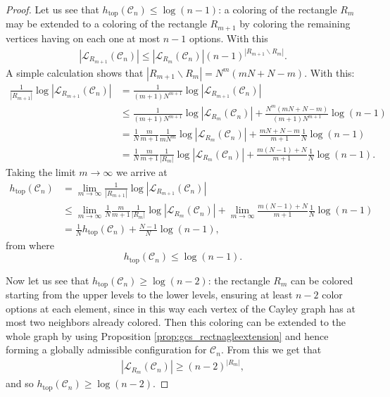 \documentclass[letterpaper,10pt]{article}
\theoremstyle{plain}
\def\htop{h_{\mathrm{top}}}
\begin{document}
\begin{proof}
	Let us see that $\htop(\mathcal{C}_n)\le \log(n-1)$: a coloring of the rectangle $R_m$ may be extended to a coloring of the rectangle $R_{m+1}$ by coloring the remaining vertices having on each one at most $n-1$ options. With this
	\begin{align*}
	|\mathcal{L}_{R_{m+1}}(\mathcal{C}_n)|\le |\mathcal{L}_{R_m}(\mathcal{C}_{n})|(n-1)^{|R_{m+1}\backslash R_m|}.
	\end{align*}
	A simple calculation shows that $|R_{m+1}\backslash R_{m}|=N^m(mN+N-m)$. 
	With this:
	\begin{align*}
	\frac{1}{|R_{m+1}|}\log|\mathcal{L}_{R_{m+1}}(\mathcal{C}_n)|&=\frac{1}{(m+1)N^{m+1}}\log|\mathcal{L}_{R_{m+1}}(\mathcal{C}_n)|\\
	&\le \frac{1}{(m+1)N^{m+1}}\log|\mathcal{L}_{R_m}(\mathcal{C}_{n})|+\frac{N^m(mN+N-m)}{(m+1)N^{m+1}}\log(n-1)\\
	&=\frac{1}{N}\frac{m}{m+1}\frac{1}{mN^{m}}\log|\mathcal{L}_{R_m}(\mathcal{C}_{n})|+ \frac{mN+N-m}{m+1}\frac{1}{N}\log(n-1)\\
	&=\frac{1}{N}\frac{m}{m+1}\frac{1}{|R_m|}\log|\mathcal{L}_{R_m}(\mathcal{C}_{n})|+ \frac{m(N-1)+N}{m+1}\frac{1}{N}\log(n-1).
	\end{align*}
	Taking the limit $m\to \infty$ we arrive at
	\begin{align*}
	\htop(\mathcal{C}_n)&=\lim_{m\to \infty }	\frac{1}{|R_{m+1}|}\log|\mathcal{L}_{R_{m+1}}(\mathcal{C}_n)|\\
	&\le \lim_{m\to \infty }\frac{1}{N}\frac{m}{m+1}\frac{1}{|R_m|}\log|\mathcal{L}_{R_m}(\mathcal{C}_{n})| +\lim_{m\to \infty }\frac{m(N-1)+N}{m+1}\frac{1}{N}\log(n-1)\\
	&= \frac{1}{N}\htop(\mathcal{C}_n)+\frac{N-1}{N}\log(n-1),
	\end{align*}
	from where 
	 $$\htop(\mathcal{C}_n)\le \log(n-1).$$
	
	
	Now let us see that $\htop(\mathcal{C}_n)\ge \log(n-2)$:
	the rectangle $R_m$ can be colored starting from the upper levels to the lower levels, ensuring at least $n-2$ color options at each element, since in this way each vertex of the Cayley graph has at most two neighbors already colored. Then this coloring can be extended to the whole graph by using Proposition \ref{prop:gcs_rectnagleextension} and hence forming a globally admissible configuration for $\mathcal{C}_n$. From this we get that
	\begin{align*}
	|\mathcal{L}_{R_m}(\mathcal{C}_{n})|\ge (n-2)^{|R_m|},
	\end{align*}
	and so $\htop(\mathcal{C}_n)\ge \log(n-2)$.
\end{proof}
\end{document}
